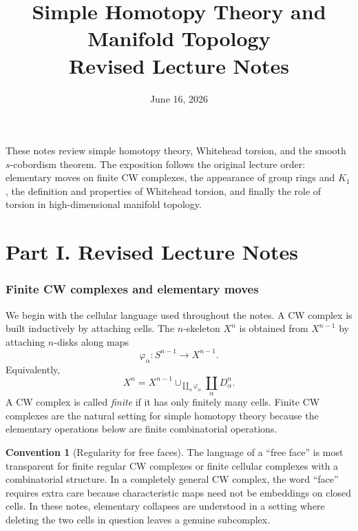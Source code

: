 \documentclass[11pt,a4paper]{article}
\title{Simple Homotopy Theory and Manifold Topology\\\large Revised Lecture Notes}
\author{}
\date{June 16, 2026}
\theoremstyle{definition}
\newtheorem{convention}[definition]{Convention}
\theoremstyle{plain}
\theoremstyle{remark}
\begin{document}
\maketitle

\begin{center}
\begin{minipage}{0.88\textwidth}
These notes review simple homotopy theory, Whitehead torsion, and the smooth \(s\)-cobordism theorem. The exposition follows the original lecture order: elementary moves on finite CW complexes, the appearance of group rings and \(K_1\), the definition and properties of Whitehead torsion, and finally the role of torsion in high-dimensional manifold topology.
\end{minipage}
\end{center}

\tableofcontents
\newpage

\part*{Part I. Revised Lecture Notes}

\section{Finite CW complexes and elementary moves}

We begin with the cellular language used throughout the notes. A CW complex is built inductively by attaching cells. The \(n\)-skeleton \(X^n\) is obtained from \(X^{n-1}\) by attaching \(n\)-disks along maps
\[
  \varphi_\alpha:S^{n-1}\longrightarrow X^{n-1}.
\]
Equivalently,
\[
  X^n=X^{n-1}\cup_{\coprod_\alpha \varphi_\alpha}\coprod_\alpha D^n_\alpha .
\]
A CW complex is called \emph{finite} if it has only finitely many cells. Finite CW complexes are the natural setting for simple homotopy theory because the elementary operations below are finite combinatorial operations.

\begin{convention}[Regularity for free faces]
The language of a ``free face'' is most transparent for finite regular CW complexes or finite cellular complexes with a combinatorial structure. In a completely general CW complex, the word ``face'' requires extra care because characteristic maps need not be embeddings on closed cells. In these notes, elementary collapses are understood in a setting where deleting the two cells in question leaves a genuine subcomplex.
\end{convention}
\end{document}
